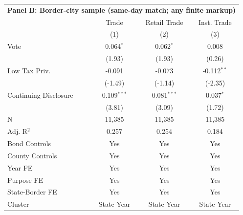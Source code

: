 \begingroup
\centering
\begin{tabular*}{\textwidth}{@{\extracolsep{\fill}}lccc}
\multicolumn{5}{l}{\textbf{Panel B: Border-city sample (same-day match; any finite markup)}}\\

\addlinespace
   \toprule
                         & Trade         & Retail Trade  & Inst. Trade\\  
                         & (1)           & (2)           & (3)\\  
   \midrule 
   Vote                  & 0.064$^{*}$   & 0.062$^{*}$   & 0.008\\   
                         & (1.93)       & (1.93)       & (0.26)\\   
   Low Tax Priv.         & -0.091        & -0.073        & -0.112$^{**}$\\   
                         & (-1.49)      & (-1.14)      & (-2.35)\\   
   Continuing Disclosure & 0.109$^{***}$ & 0.081$^{***}$ & 0.037$^{*}$\\   
                         & (3.81)       & (3.09)       & (1.72)\\   
   \hline
   N          & 11,385        & 11,385        & 11,385\\  
   Adj. R$^2$        & 0.257         & 0.254         & 0.184\\  
   Bond Controls         & Yes           & Yes           & Yes\\  
   County Controls       & Yes           & Yes           & Yes\\  
   Year FE               & Yes           & Yes           & Yes\\  
   Purpose FE            & Yes           & Yes           & Yes\\  
   State-Border FE       & Yes           & Yes           & Yes\\  
   Cluster              & State-Year & State-Year & State-Year\\  
   \bottomrule
\end{tabular*}
\par\endgroup
